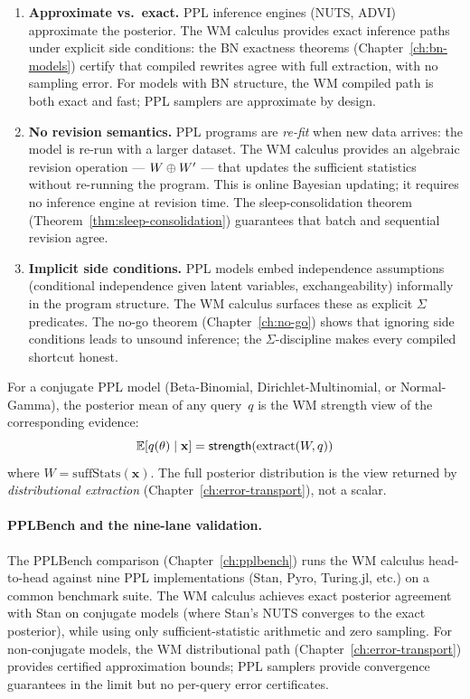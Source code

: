 \begin{enumerate}
\item \textbf{Approximate vs.\ exact.}  PPL inference engines
  (NUTS, ADVI) approximate the posterior.  The WM calculus provides
  exact inference paths under explicit side conditions: the BN
  exactness theorems (Chapter~\ref{ch:bn-models}) certify that
  compiled rewrites agree with full extraction, with no sampling
  error.  For models with BN structure, the WM compiled path is
  both exact and fast; PPL samplers are approximate by design.

\item \textbf{No revision semantics.}  PPL programs are
  \emph{re-fit} when new data arrives: the model is re-run with a
  larger dataset.  The WM calculus provides an algebraic revision
  operation --- $W \oplus W'$ --- that updates the sufficient
  statistics without re-running the program.  This is online
  Bayesian updating; it requires no inference engine at
  revision time.  The sleep-consolidation theorem
  (Theorem~\ref{thm:sleep-consolidation}) guarantees that batch and
  sequential revision agree.

\item \textbf{Implicit side conditions.}  PPL models embed
  independence assumptions (conditional independence given latent
  variables, exchangeability) informally in the program structure.
  The WM calculus surfaces these as explicit $\Sigma$ predicates.
  The no-go theorem (Chapter~\ref{ch:no-go}) shows that ignoring
  side conditions leads to unsound inference; the $\Sigma$-discipline
  makes every compiled shortcut honest.
\end{enumerate}

\begin{proposition}
\label{prop:ppl-strength-view}
For a conjugate PPL model (Beta-Binomial, Dirichlet-Multinomial, or
Normal-Gamma), the posterior mean of any query~$q$ is the WM strength
view of the corresponding evidence:
\[
  \mathbb{E}[q(\theta) \mid \mathbf{x}] =
  \mathsf{strength}(\mathrm{extract}(W, q))
\]
where $W = \mathrm{suffStats}(\mathbf{x})$.  The full posterior
distribution is the view returned by \emph{distributional extraction}
(Chapter~\ref{ch:error-transport}), not a scalar.
\end{proposition}

\paragraph{PPLBench and the nine-lane validation.}
The PPLBench comparison (Chapter~\ref{ch:pplbench}) runs the WM
calculus head-to-head against nine PPL implementations (Stan, Pyro,
Turing.jl, etc.) on a common benchmark suite.  The WM calculus
achieves exact posterior agreement with Stan on conjugate models
(where Stan's NUTS converges to the exact posterior), while using
only sufficient-statistic arithmetic and zero sampling.  For
non-conjugate models, the WM distributional path
(Chapter~\ref{ch:error-transport}) provides certified approximation
bounds; PPL samplers provide convergence guarantees in the limit
but no per-query error certificates.

